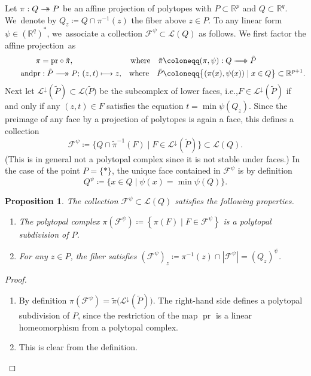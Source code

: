 \documentclass[10pt,a4paper]{amsart}
\newcommand{\ie}{i.e.,\xspace}
\newcommand{\skpt}{\smallskip}
\numberwithin{equation}{section}\providecommand{\No}{}
\let\mathcal\mathscr
\def\mto{\mathchoice{\longmapsto}{\mapsto}{\mapsto}{\mapsto}}
\def\ltwoheadrightarrow{\longrightarrow\hspace*{-5mm}\longrightarrow}
\def\stwoheadrightarrow{\rightarrow\hspace*{-3mm}\rightarrow}
\def\twoheadrightarrow{\mathchoice{\ltwoheadrightarrow}{\stwoheadrightarrow}{\stwoheadrightarrow}{\stwoheadrightarrow}}
\theoremstyle{plain}
\newtheorem{proposition}{Proposition}
\theoremstyle{definition}
\newcommand{\RR}{\mathbb{R}}
\newcommand{\La}{\mathcal{L}}
\newcommand{\sF}{\mathcal{F}}
\DeclareMathOperator{\pr}{pr}
\begin{document}
Let $\pi: Q\twoheadrightarrow P$ be an affine projection of polytopes with
$P\subset \RR^p$ and $Q\subset \RR^q$.
We~denote by $Q_z\coloneqq Q\cap \pi^{-1}(z)$ the fiber above $z\in P$.
To any linear form $\psi\in (\RR^q)^{\ast}$, we~associate a
collection
$\sF^\psi\subset \La(Q)$ as follows.
We first factor the affine projection~as\vspace*{-3pt}
\begin{align*}
\pi&=\mathrm{pr}\circ \tilde{\pi},& \text{where} \quad
\tilde{\pi}&\coloneqq (\pi, \psi): Q\twoheadrightarrow \tilde{P}\\
\tag*{and}
\mathrm{pr}&: \tilde{P}\twoheadrightarrow P;\, (z, t)\mto z,&
\text{where}\quad \tilde{P}&\coloneqq \big\{(\pi(x), \psi(x))\mid x\in Q\big\}\subset \RR^{p+1}.
\end{align*}
Next let $\La^{\downarrow}(\tilde P) \subset \La\big(\tilde{P}\big)$ be the subcomplex of lower faces, \ie $F\in \La^{\downarrow}(\tilde P)$ if and only if any $(z, t)\in F$ satisfies the equation
$t = \min \psi(Q_z)$. Since the preimage of any face by a projection of polytopes is again a face, this defines a collection\vspace*{-3pt}\enlargethispage{.5\baselineskip}%
\[\sF^\psi \coloneqq
\big\{Q\cap \tilde{\pi}^{-1}(F) \mid F\in \La^{\downarrow}(\tilde P)
\big\}
\subset \La(Q).\]
(This is in general not a polytopal complex since it is not stable under faces.)
In the case of the point $P=\{\ast\}$, the unique face contained in $\sF^\psi$ is by definition\vspace*{-3pt}
\[Q^\psi\coloneqq\{x\in Q \mid \psi (x) = \min \psi(Q)\}.\]

\begin{proposition}\label{prop:CoherentSubdivision}
The collection $\sF^\psi \subset \La(Q)$ satisfies the following properties.
\begin{enumerate}
\item\label{prop:CoherentSubdivision1} The polytopal complex $\pi(\sF^\psi)\coloneqq\left\{\pi(F)\mid F\in \sF^\psi \right\}$ is a polytopal subdivision of $P$.
\item\label{prop:CoherentSubdivision2} For any $z\in P$, the fiber satisfies $(\sF^\psi)_z \coloneqq\pi^{-1}(z) \cap\left| \sF^\psi\right|=\left(Q_z\right)^\psi$.
\end{enumerate}
\end{proposition}

\skpt
\begin{proof}
\begin{enumerate}
\item By definition $\pi\left(\sF^\psi\right) = \tilde\pi\big(\La^{\downarrow}(\tilde P)\big)$. The right-hand side defines a polytopal subdivision of $P$, since the restriction of the map $\pr$ is a linear homeomorphism from a polytopal complex.
\item This is clear from the definition.\qedhere
\end{enumerate}
\end{proof}
\end{document}
